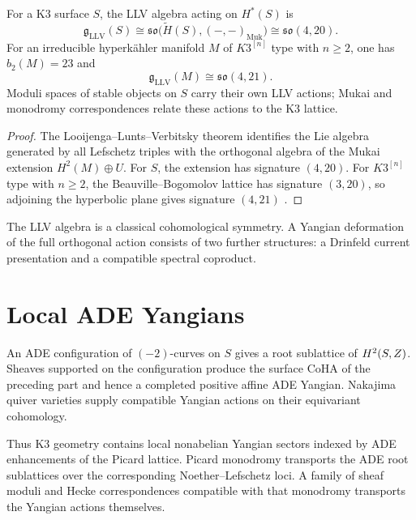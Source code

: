 \begin{theorem}
For a K3 surface $S$, the LLV algebra acting on $H^*(S)$ is
\[
 \mathfrak g_{\mathrm{LLV}}(S)
 \cong\mathfrak{so}\bigl(\widetilde H(S),(-,-)_{\mathrm{Muk}}\bigr)
 \cong\mathfrak{so}(4,20).
\]
For an irreducible hyperk\"ahler manifold $M$ of $K3^{[n]}$ type with $n\ge2$, one has $b_2(M)=23$ and
\[
 \mathfrak g_{\mathrm{LLV}}(M)\cong\mathfrak{so}(4,21).
\]
Moduli spaces of stable objects on $S$ carry their own LLV actions; Mukai and monodromy correspondences relate these actions to the K3 lattice.
\end{theorem}
\begin{proof}
The Looijenga--Lunts--Verbitsky theorem identifies the Lie algebra generated by all Lefschetz triples with the orthogonal algebra of the Mukai extension $H^2(M)\oplus U$. For $S$, the extension has signature $(4,20)$. For $K3^{[n]}$ type with $n\ge2$, the Beauville--Bogomolov lattice has signature $(3,20)$, so adjoining the hyperbolic plane gives signature $(4,21)$ \cite{LooijengaLunts,Verbitsky96}.
\end{proof}

The LLV algebra is a classical cohomological symmetry. A Yangian deformation of the full orthogonal action consists of two further structures: a Drinfeld current presentation and a compatible spectral coproduct.

\chapter{Local ADE Yangians}
An ADE configuration of $(-2)$-curves on $S$ gives a root sublattice of $H^2(S,Z)$. Sheaves supported on the configuration produce the surface CoHA of the preceding part and hence a completed positive affine ADE Yangian. Nakajima quiver varieties supply compatible Yangian actions on their equivariant cohomology.

Thus K3 geometry contains local nonabelian Yangian sectors indexed by ADE enhancements of the Picard lattice. Picard monodromy transports the ADE root sublattices over the corresponding Noether--Lefschetz loci. A family of sheaf moduli and Hecke correspondences compatible with that monodromy transports the Yangian actions themselves.

